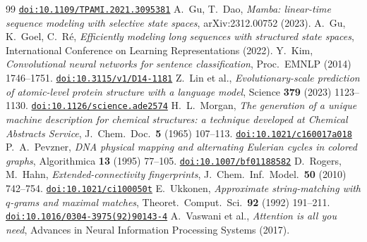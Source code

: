 \documentclass[11pt]{article}
\newcommand{\doi}[1]{\href{https://doi.org/#1}{\nolinkurl{doi:#1}}}
\theoremstyle{plain}
\theoremstyle{definition}
\theoremstyle{remark}
\begin{document}
\begin{thebibliography}{99}
\doi{10.1109/TPAMI.2021.3095381}
 A.~Gu, T.~Dao, \emph{Mamba: linear-time sequence modeling with selective state spaces},
arXiv:2312.00752 (2023).
 A.~Gu, K.~Goel, C.~R\'e, \emph{Efficiently modeling long sequences with structured state spaces},
International Conference on Learning Representations (2022).
 Y.~Kim, \emph{Convolutional neural networks for sentence classification}, Proc.\ EMNLP (2014)
1746--1751. \doi{10.3115/v1/D14-1181}
 Z.~Lin et al., \emph{Evolutionary-scale prediction of atomic-level protein structure with a
language model}, Science \textbf{379} (2023) 1123--1130. \doi{10.1126/science.ade2574}
 H.~L.~Morgan, \emph{The generation of a unique machine description for chemical
structures: a technique developed at Chemical Abstracts Service}, J.\ Chem.\ Doc.\ \textbf{5} (1965) 107--113.
\doi{10.1021/c160017a018}
 P.~A.~Pevzner, \emph{DNA physical mapping and alternating Eulerian cycles in colored
graphs}, Algorithmica \textbf{13} (1995) 77--105. \doi{10.1007/bf01188582}
 D.~Rogers, M.~Hahn, \emph{Extended-connectivity fingerprints}, J.\ Chem.\ Inf.\ Model.\
\textbf{50} (2010) 742--754. \doi{10.1021/ci100050t}
 E.~Ukkonen, \emph{Approximate string-matching with $q$-grams and maximal matches},
Theoret.\ Comput.\ Sci.\ \textbf{92} (1992) 191--211. \doi{10.1016/0304-3975(92)90143-4}
\bibitem{Vaswani17} A.~Vaswani et al., \emph{Attention is all you need}, Advances in Neural Information
Processing Systems (2017).
\end{thebibliography}
\end{document}
